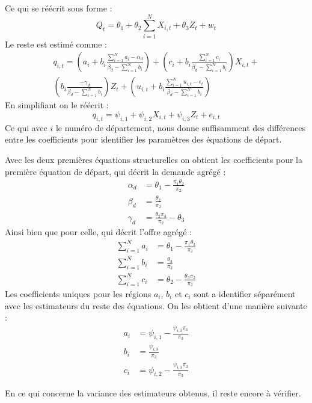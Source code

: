 \documentclass[11pt, a4paper]{article}
\begin{document}
Ce qui se réécrit sous forme :
\begin{equation}
  Q_t = \theta_1 + 
      \theta_2 \sum_{i = 1}^{N} X_{i,t} +
      \theta_3 Z_t + 
      w_t
\end{equation}
Le reste est estimé comme :
\begin{multline}
  q_{i,t} = (a_i + b_i \frac{\sum_{i = 1}^{N} a_i - \alpha_d}{\beta_d - \sum_{i = 1}^{N} b_i}) + 
      (c_i + b_i \frac{\sum_{i = 1}^{N} c_i}{\beta_d - \sum_{i = 1}^{N} b_i}) X_{i,t} + \\
      (b_i \frac{-\gamma_d}{\beta_d - \sum_{i = 1}^{N} b_i}) Z_t + 
      (u_{i,t} + b_i \frac{\sum_{i = 1}^{N} u_{i,t} - \epsilon_t}{\beta_d - \sum_{i = 1}^{N} b_i})
\end{multline}
En simplifiant on le réécrit : 
\begin{equation}
  q_{i,t} = \psi_{i,1} + 
      \psi_{i,2} X_{i,t} +
      \psi_{i,3} Z_t + 
      e_{i,t}
\end{equation}
Ce qui avec $i$ le numéro de département, nous donne suffisamment des différences entre les coefficients pour identifier les paramètres des équations de départ. 
\par
Avec les deux premières équations structurelles on obtient les coefficients pour la première équation de départ, qui décrit la demande agrégé :
\begin{align}
  \alpha_d & = \theta_1 - \frac{\pi_1 \theta_2}{\pi_2} \\
  \beta_d & = \frac{\theta_2}{\pi_2} \\
  \gamma_d & = \frac{\theta_2 \pi_3}{\pi_2} - \theta_3
\end{align}
Ainsi bien que pour celle, qui décrit l'offre agrégé :
\begin{align}
  \sum_{i = 1}^{N} a_i & = \theta_1 - \frac{\pi_1 \theta_3}{\pi_3} \\
  \sum_{i = 1}^{N} b_i & = \frac{\theta_3}{\pi_3} \\
  \sum_{i = 1}^{N} c_i & = \theta_2 - \frac{\theta_3 \pi_2}{\pi_3}
\end{align}
Les coefficients uniques pour les régions $a_i$, $b_i$ et $c_i$ sont a identifier séparément avec les estimateurs du reste des équations.
On les obtient d'une manière suivante :
\begin{align}
  a_i & = \psi_{i,1} - \frac{\psi_{i,3} \pi_1}{\pi_3} \\
  b_i & = \frac{\psi_{i,3}}{\pi_3} \\
  c_i & = \psi_{i,2} - \frac{\psi_{i,3} \pi_2}{\pi_3}
\end{align}
\par
En ce qui concerne la variance des estimateurs obtenus, il reste encore à vérifier.
\end{document}
